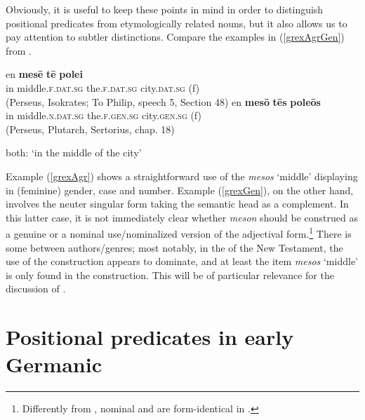 \documentclass[output=paper,colorlinks,citecolor=brown]{langscibook}
\begin{document}
Obviously, it is useful to keep these points in mind in order to distinguish positional predicates from etymologically related nouns, but it also allows  us to pay attention to subtler distinctions. Compare the examples in (\ref{grexAgrGen}) from .

\begin{exe}
   \ex \label{grexAgrGen}
      \begin{xlist}
         \ex \label{grexAgr}
          \gll en \textbf{mes\=e} \textbf{{t\=e}} \textbf{{polei}}    \\ 
             in middle.\textsc{f.dat.sg}  the.\textsc{f.dat.sg}  city.\textsc{dat.sg}  (f)  \\ 
           \glt (Perseus, Isokrates; To Philip, speech 5, Section 48)    
         \ex \label{grexGen}
           \gll   en \textbf{mes\=o} \textbf{t\=es} \textbf{pole\=os}    \\ 
             in  middle.\textsc{n.dat.sg} the.\textsc{f.gen.sg}  city.\textsc{gen.sg} (f) \\
              \glt (Perseus, Plutarch, Sertorius, chap. 18)       %
     \end{xlist}
     both: `in the middle of the city'
\end{exe}


Example (\ref{grexAgr}) shows a straightforward use of the  \textit{mesos} `middle'  displaying  in (feminine) gender, case and number. Example (\ref{grexGen}), on the other hand, involves the neuter singular form taking the semantic head  as a  complement. In this latter case, it is not immediately clear whether \textit{meson} should be construed as a genuine  or a nominal use/nominalized version of the adjectival form.\footnote{Differently from , nominal and  are form-identical in .}  There is some  between authors/genres; most notably, in the  of the New Testament, the use of the  construction appears to dominate, and at least the item \textit{mesos} `middle' is only found in the  construction.  This will be of particular relevance for the discussion of .




\section{Positional predicates in early Germanic}
\label{sec:10:POG}
\end{document}
